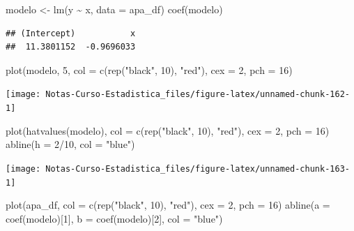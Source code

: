 \documentclass[
  12pt,
]{book}
\newenvironment{Shaded}{\begin{snugshade}}{\end{snugshade}}
\newcommand{\AttributeTok}[1]{\textcolor[rgb]{0.77,0.63,0.00}{#1}}
\newcommand{\DecValTok}[1]{\textcolor[rgb]{0.00,0.00,0.81}{#1}}
\newcommand{\FunctionTok}[1]{\textcolor[rgb]{0.00,0.00,0.00}{#1}}
\newcommand{\NormalTok}[1]{#1}
\newcommand{\OtherTok}[1]{\textcolor[rgb]{0.56,0.35,0.01}{#1}}
\newcommand{\SpecialCharTok}[1]{\textcolor[rgb]{0.00,0.00,0.00}{#1}}
\newcommand{\StringTok}[1]{\textcolor[rgb]{0.31,0.60,0.02}{#1}}
\theoremstyle{definition}
\theoremstyle{definition}
\theoremstyle{definition}
\theoremstyle{definition}
\theoremstyle{remark}
\begin{document}
\begin{Shaded}
\begin{Highlighting}[]
\NormalTok{modelo }\OtherTok{\textless{}{-}} \FunctionTok{lm}\NormalTok{(y }\SpecialCharTok{\textasciitilde{}}\NormalTok{ x, }\AttributeTok{data =}\NormalTok{ apa\_df)}
\FunctionTok{coef}\NormalTok{(modelo)}
\end{Highlighting}
\end{Shaded}

\begin{verbatim}
## (Intercept)           x 
##  11.3801152  -0.9696033
\end{verbatim}

\begin{Shaded}
\begin{Highlighting}[]
\FunctionTok{plot}\NormalTok{(modelo, }\DecValTok{5}\NormalTok{, }\AttributeTok{col =} \FunctionTok{c}\NormalTok{(}\FunctionTok{rep}\NormalTok{(}\StringTok{"black"}\NormalTok{, }\DecValTok{10}\NormalTok{), }\StringTok{"red"}\NormalTok{), }\AttributeTok{cex =} \DecValTok{2}\NormalTok{,}
    \AttributeTok{pch =} \DecValTok{16}\NormalTok{)}
\end{Highlighting}
\end{Shaded}

\begin{center}\texttt{[image: Notas-Curso-Estadistica\_files/figure-latex/unnamed-chunk-162-1]} \end{center}

\begin{Shaded}
\begin{Highlighting}[]
\FunctionTok{plot}\NormalTok{(}\FunctionTok{hatvalues}\NormalTok{(modelo), }\AttributeTok{col =} \FunctionTok{c}\NormalTok{(}\FunctionTok{rep}\NormalTok{(}\StringTok{"black"}\NormalTok{, }\DecValTok{10}\NormalTok{), }\StringTok{"red"}\NormalTok{),}
    \AttributeTok{cex =} \DecValTok{2}\NormalTok{, }\AttributeTok{pch =} \DecValTok{16}\NormalTok{)}
\FunctionTok{abline}\NormalTok{(}\AttributeTok{h =} \DecValTok{2}\SpecialCharTok{/}\DecValTok{10}\NormalTok{, }\AttributeTok{col =} \StringTok{"blue"}\NormalTok{)}
\end{Highlighting}
\end{Shaded}

\begin{center}\texttt{[image: Notas-Curso-Estadistica\_files/figure-latex/unnamed-chunk-163-1]} \end{center}

\begin{Shaded}
\begin{Highlighting}[]
\FunctionTok{plot}\NormalTok{(apa\_df, }\AttributeTok{col =} \FunctionTok{c}\NormalTok{(}\FunctionTok{rep}\NormalTok{(}\StringTok{"black"}\NormalTok{, }\DecValTok{10}\NormalTok{), }\StringTok{"red"}\NormalTok{), }\AttributeTok{cex =} \DecValTok{2}\NormalTok{,}
    \AttributeTok{pch =} \DecValTok{16}\NormalTok{)}
\FunctionTok{abline}\NormalTok{(}\AttributeTok{a =} \FunctionTok{coef}\NormalTok{(modelo)[}\DecValTok{1}\NormalTok{], }\AttributeTok{b =} \FunctionTok{coef}\NormalTok{(modelo)[}\DecValTok{2}\NormalTok{], }\AttributeTok{col =} \StringTok{"blue"}\NormalTok{)}
\end{Highlighting}
\end{Shaded}
\end{document}
